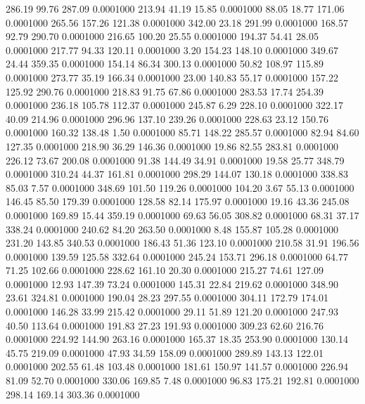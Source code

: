  286.19   99.76  287.09   0.0001000
 213.94   41.19   15.85   0.0001000
  88.05   18.77  171.06   0.0001000
 265.56  157.26  121.38   0.0001000
 342.00   23.18  291.99   0.0001000
 168.57   92.79  290.70   0.0001000
 216.65  100.20   25.55   0.0001000
 194.37   54.41   28.05   0.0001000
 217.77   94.33  120.11   0.0001000
   3.20  154.23  148.10   0.0001000
 349.67   24.44  359.35   0.0001000
 154.14   86.34  300.13   0.0001000
  50.82  108.97  115.89   0.0001000
 273.77   35.19  166.34   0.0001000
  23.00  140.83   55.17   0.0001000
 157.22  125.92  290.76   0.0001000
 218.83   91.75   67.86   0.0001000
 283.53   17.74  254.39   0.0001000
 236.18  105.78  112.37   0.0001000
 245.87    6.29  228.10   0.0001000
 322.17   40.09  214.96   0.0001000
 296.96  137.10  239.26   0.0001000
 228.63   23.12  150.76   0.0001000
 160.32  138.48    1.50   0.0001000
  85.71  148.22  285.57   0.0001000
  82.94   84.60  127.35   0.0001000
 218.90   36.29  146.36   0.0001000
  19.86   82.55  283.81   0.0001000
 226.12   73.67  200.08   0.0001000
  91.38  144.49   34.91   0.0001000
  19.58   25.77  348.79   0.0001000
 310.24   44.37  161.81   0.0001000
 298.29  144.07  130.18   0.0001000
 338.83   85.03    7.57   0.0001000
 348.69  101.50  119.26   0.0001000
 104.20    3.67   55.13   0.0001000
 146.45   85.50  179.39   0.0001000
 128.58   82.14  175.97   0.0001000
  19.16   43.36  245.08   0.0001000
 169.89   15.44  359.19   0.0001000
  69.63   56.05  308.82   0.0001000
  68.31   37.17  338.24   0.0001000
 240.62   84.20  263.50   0.0001000
   8.48  155.87  105.28   0.0001000
 231.20  143.85  340.53   0.0001000
 186.43   51.36  123.10   0.0001000
 210.58   31.91  196.56   0.0001000
 139.59  125.58  332.64   0.0001000
 245.24  153.71  296.18   0.0001000
  64.77   71.25  102.66   0.0001000
 228.62  161.10   20.30   0.0001000
 215.27   74.61  127.09   0.0001000
  12.93  147.39   73.24   0.0001000
 145.31   22.84  219.62   0.0001000
 348.90   23.61  324.81   0.0001000
 190.04   28.23  297.55   0.0001000
 304.11  172.79  174.01   0.0001000
 146.28   33.99  215.42   0.0001000
  29.11   51.89  121.20   0.0001000
 247.93   40.50  113.64   0.0001000
 191.83   27.23  191.93   0.0001000
 309.23   62.60  216.76   0.0001000
 224.92  144.90  263.16   0.0001000
 165.37   18.35  253.90   0.0001000
 130.14   45.75  219.09   0.0001000
  47.93   34.59  158.09   0.0001000
 289.89  143.13  122.01   0.0001000
 202.55   61.48  103.48   0.0001000
 181.61  150.97  141.57   0.0001000
 226.94   81.09   52.70   0.0001000
 330.06  169.85    7.48   0.0001000
  96.83  175.21  192.81   0.0001000
 298.14  169.14  303.36   0.0001000
